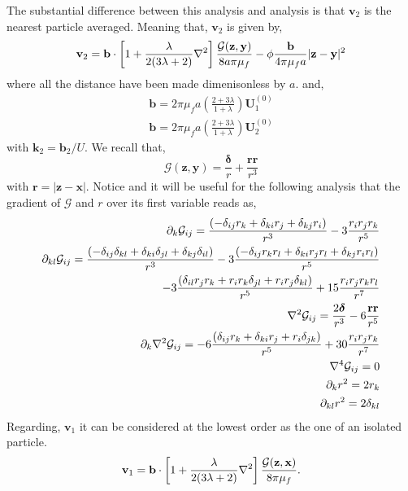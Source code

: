 The substantial difference between this analysis and \citet{kim2013microhydrodynamics} analysis is that $\textbf{v}_2$ is the nearest particle averaged.
Meaning that, $\textbf{v}_2$ is given by, 
\begin{equation}
    \textbf{v}_2 = 
    \textbf{b} \cdot \left[
        1
        + \frac{\lambda}{2(3\lambda +2)}\mathbf{\nabla}^2
    \right]\frac{\mathcal{G}(\textbf{z},\textbf{y})}{8a\pi\mu_f}
    - \phi \frac{\textbf{b}}{4 \pi \mu_f a} |\textbf{z} - \textbf{y}|^2 
\end{equation}
where all the distance have been made dimenisonless by $a$. 
and, 
\begin{align}
    \textbf{b} = 2 \pi \mu_f a \left(\frac{2+3\lambda}{1+\lambda}\right) \textbf{U}_1^{(0)}\\
    \textbf{b} = 2 \pi \mu_f a \left(\frac{2+3\lambda}{1+\lambda}\right) \textbf{U}_2^{(0)}
\end{align}
with $\textbf{k}_2 = \textbf{b}_2/U$. 
We recall that, 
\begin{equation}
    \mathcal{G}(\textbf{z},\textbf{y})
    = \frac{\bm\delta}{r}+\frac{\textbf{rr}}{r^3}
\end{equation}
with $\textbf{r} = |\textbf{z} - \textbf{x}|$. 
Notice and it will be useful for the following analysis that the gradient of $\mathcal{G}$ and $r$ over its first variable reads as, 
\begin{align}
    \partial_k \mathcal{G}_{ij}
    = 
    \frac{( - \delta_{ij}r_k+ \delta_{ki}r_j +\delta_{kj}r_i)}{r^3}
    - 3\frac{r_ir_jr_k}{r^5}\\
    \partial_{kl} \mathcal{G}_{ij}
    = 
    \frac{( - \delta_{ij}\delta_{kl}+ \delta_{ki}\delta_{jl} +\delta_{kj}\delta_{il})}{r^3}
    - 3\frac{( - \delta_{ij}r_kr_l+ \delta_{ki}r_jr_l +\delta_{kj}r_ir_l)}{r^5}\\
    - 3\frac{(\delta_{il}r_jr_k + r_ir_k \delta_{jl} + r_ir_j\delta_{kl})}{r^5}
    + 15\frac{r_ir_jr_kr_l}{r^7}
    \\
    \mathbf{\nabla}^2 \mathcal{G}_{ij}
    = 
    \frac{2 \bm\delta}{r^3}
    - 6\frac{\textbf{rr}}{r^5}\\
    \partial_k \mathbf{\nabla}^2 \mathcal{G}_{ij}
    = 
    - 6\frac{(\delta_{ij} r_k + \delta_{ki} r_j+ r_i \delta_{jk})}{r^5}
    + 30\frac{r_ir_jr_k}{r^7}
    \\
    \mathbf{\nabla}^4 \mathcal{G}_{ij}
    = 
   0
    \\
    \partial_k r^2 = 2 r_k\\
    \partial_{kl} r^2 = 2 \delta_{kl}
\end{align}
Regarding, $\textbf{v}_1$ it can be considered at the lowest order as the one of an isolated particle. 
\begin{equation}
    \textbf{v}_1 = 
    \textbf{b} \cdot \left[
        1
        + \frac{\lambda}{2(3\lambda +2)}\mathbf{\nabla}^2
    \right]\frac{\mathcal{G}(\textbf{z},\textbf{x})}{8\pi\mu_f}. 
\end{equation}

